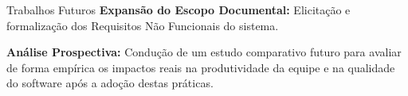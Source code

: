 \begin{frame}{Trabalhos Futuros}
    \textbf{Expansão do Escopo Documental:} Elicitação e formalização dos Requisitos Não Funcionais do sistema.
    
    \vspace{1.5em}
    
    \textbf{Análise Prospectiva:} Condução de um estudo comparativo futuro para avaliar de forma empírica os impactos reais na produtividade da equipe e na qualidade do software após a adoção destas práticas.
\end{frame}